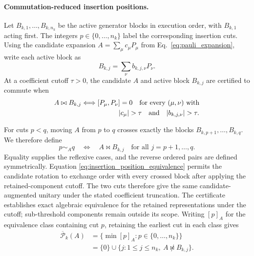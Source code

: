 \documentclass[
  reprint,
  amsmath,
  amssymb,
  aps,
  pra,
  nofootinbib,
  superscriptaddress,
  floatfix
]{revtex4-2}
\begin{document}
\paragraph*{Commutation-reduced insertion positions.}
Let \(B_{k,1},\ldots,B_{k,n_k}\) be the active generator blocks in execution
order, with \(B_{k,1}\) acting first. The integers
\(p\in\{0,\ldots,n_k\}\) label the corresponding insertion cuts. Using the
candidate expansion \(A=\sum_\mu c_\mu P_\mu\) from
Eq.~\eqref{eq:pauli_expansion}, write each active block as
\begin{equation*}
B_{k,j}
=
\sum_\nu b_{k,j,\nu}P_\nu.
\end{equation*}
At a coefficient cutoff \(\tau>0\), the candidate \(A\) and active
block \(B_{k,j}\) are certified to commute when
\begin{equation*}
\begin{aligned}
A\bowtie B_{k,j}
&\Longleftrightarrow [P_\mu,P_\nu]=0
\quad\text{for every }(\mu,\nu)\text{ with}\\
&\hspace{5.5em}|c_\mu|>\tau
\quad\text{and}\quad |b_{k,j,\nu}|>\tau.
\end{aligned}
\end{equation*}

For cuts \(p<q\), moving \(A\) from \(p\) to \(q\) crosses exactly the blocks
\(B_{k,p+1},\ldots,B_{k,q}\). We therefore define
\begin{equation}
p\sim_A q
\quad\Longleftrightarrow\quad
A\bowtie B_{k,j}
\quad
\text{for all }j=p+1,\ldots,q.
\label{eq:insertion_position_equivalence}
\end{equation}
Equality supplies the reflexive cases, and the reverse ordered pairs are
defined symmetrically. Equation
\eqref{eq:insertion_position_equivalence} permits the candidate rotation to
exchange order with every crossed block after applying the retained-component
cutoff. The two cuts therefore give the same candidate-augmented unitary under
the stated coefficient truncation. The certificate establishes exact algebraic
equivalence for the retained representations under the cutoff; sub-threshold
components remain outside its scope. Writing \([p]_A\) for the equivalence
class containing cut \(p\), retaining the earliest cut in each class gives
\begin{equation}
\begin{aligned}
\overline{\mathcal P}_k(A)
&=
\{\min [p]_A:p\in\{0,\ldots,n_k\}\}
\\
&=
\{0\}\cup
\{j:1\le j\le n_k,\ A\not\bowtie B_{k,j}\}.
\end{aligned}
\label{eq:commutation_reduced_positions}
\end{equation}
\end{document}
